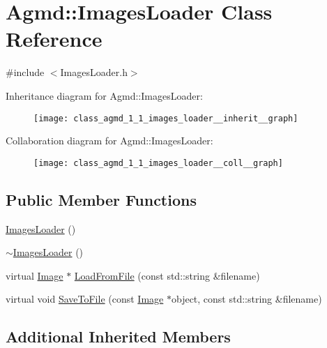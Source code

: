 \hypertarget{class_agmd_1_1_images_loader}{\section{Agmd\+:\+:Images\+Loader Class Reference}
\label{class_agmd_1_1_images_loader}
}


{\ttfamily \#include $<$Images\+Loader.\+h$>$}



Inheritance diagram for Agmd\+:\+:Images\+Loader\+:\nopagebreak
\begin{figure}[H]
\begin{center}
\leavevmode
\texttt{[image: class\_agmd\_1\_1\_images\_loader\_\_inherit\_\_graph]}
\end{center}
\end{figure}


Collaboration diagram for Agmd\+:\+:Images\+Loader\+:\nopagebreak
\begin{figure}[H]
\begin{center}
\leavevmode
\texttt{[image: class\_agmd\_1\_1\_images\_loader\_\_coll\_\_graph]}
\end{center}
\end{figure}
\subsection*{Public Member Functions}
\begin{DoxyCompactItemize}
\item 
\hyperlink{class_agmd_1_1_images_loader_ae0209f7c22b7025117e0a23521fec013}{Images\+Loader} ()
\item 
\hyperlink{class_agmd_1_1_images_loader_a8f489d3e9d1ad06506a813414dff447b}{$\sim$\+Images\+Loader} ()
\item 
virtual \hyperlink{class_agmd_1_1_image}{Image} $\ast$ \hyperlink{class_agmd_1_1_images_loader_a4b5126c9f0e9a64f121f33f69c1027db}{Load\+From\+File} (const std\+::string \&filename)
\item 
virtual void \hyperlink{class_agmd_1_1_images_loader_a60ce8f960efd5b94565ec77dc8e5a40a}{Save\+To\+File} (const \hyperlink{class_agmd_1_1_image}{Image} $\ast$object, const std\+::string \&filename)
\end{DoxyCompactItemize}
\subsection*{Additional Inherited Members}


